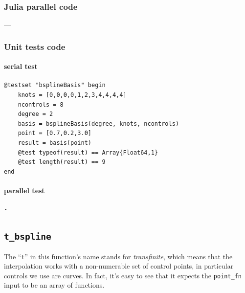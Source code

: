 \documentclass[a4paper,11pt]{article}
\begin{document}
\subsubsection{Julia parallel code}
---

\subsubsection{Unit tests code}

\paragraph{serial test}
\begin{verbatim}
@testset "bsplineBasis" begin
    knots = [0,0,0,0,1,2,3,4,4,4,4]
    ncontrols = 8
    degree = 2
    basis = bsplineBasis(degree, knots, ncontrols)
    point = [0.7,0.2,3.0]
    result = basis(point)
    @test typeof(result) == Array{Float64,1}
    @test length(result) == 9
end
\end{verbatim}

\paragraph{parallel test}
\begin{verbatim}
-
\end{verbatim}

\subsection{\texttt{t\_bspline}}

The ``\texttt{t}'' in this function's name stands for \emph{transfinite}, which means that the interpolation works with a non-numerable set of control points, in particular controls we use are curves. In fact, it's easy to see that it expects the \texttt{point\_fn} input to be an array of functions.
\end{document}
